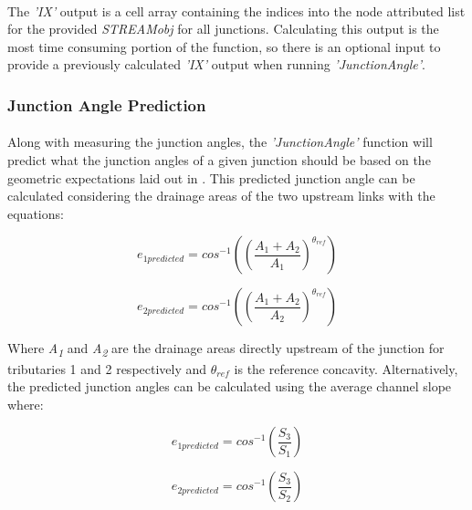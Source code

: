 \paragraph{}The \textit{'IX'} output is a cell array containing the indices into the node attributed list for the provided \textit{STREAMobj} for all junctions. Calculating this output is the most time consuming portion of the function, so there is an optional input to provide a previously calculated \textit{'IX'} output when running \textit{'JunctionAngle'}.

\subsubsection{Junction Angle Prediction}
\paragraph{}Along with measuring the junction angles, the \textit{'JunctionAngle'} function will predict what the junction angles of a given junction should be based on the geometric expectations laid out in \cite{Howard1971}. This predicted junction angle can be calculated considering the drainage areas of the two upstream links with the equations:

\begin{equation}
e_{1predicted}=cos^{-1} \left( \left( \frac{A_{1}+A_{2}}{A_{1}} \right) ^{\theta_{ref}} \right)
\end{equation}

\begin{equation}
e_{2predicted}=cos^{-1} \left( \left( \frac{A_{1}+A_{2}}{A_{2}} \right) ^{\theta_{ref}} \right)
\end{equation}

\noindent Where \textit{A\textsubscript{1}} and \textit{A\textsubscript{2}} are the drainage areas directly upstream of the junction for tributaries 1 and 2 respectively and $\theta_{ref}$ is the reference concavity. Alternatively, the predicted junction angles can be calculated using the average channel slope where:

\begin{equation}
e_{1predicted}=cos^{-1} \left( \frac{S_{3}}{S_{1}} \right)
\end{equation}

\begin{equation}
e_{2predicted}=cos^{-1} \left( \frac{S_{3}}{S_{2}} \right)
\end{equation}

